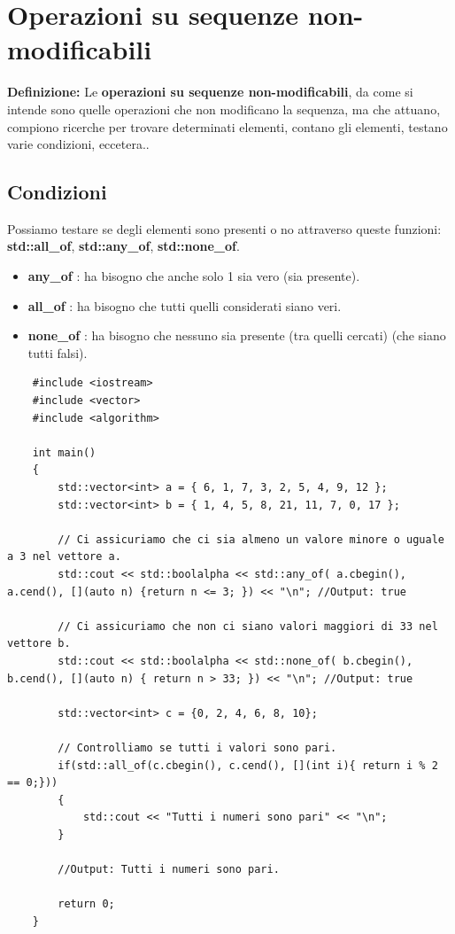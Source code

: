 
\newpage

\section{Operazioni su sequenze non-modificabili}

\textsf{\small \textbf{Definizione: } Le \textbf{operazioni su sequenze non-modificabili}, da come si intende sono quelle operazioni che non modificano la sequenza, ma che attuano, compiono ricerche per trovare determinati elementi, contano gli elementi, testano varie condizioni, eccetera..} \\

\subsection{Condizioni}

\textsf{\small Possiamo testare se degli elementi sono presenti o no attraverso queste funzioni: \textbf{std::all\_of}, \textbf{std::any\_of}, \textbf{std::none\_of}.} \\

\begin{itemize}
	\item \textsf{\small \textbf{any\_of} : ha bisogno che anche solo 1 sia vero (sia presente).}
	\item \textsf{\small \textbf{all\_of} : ha bisogno che tutti quelli considerati siano veri.}
	\item \textsf{\small \textbf{none\_of} : ha bisogno che nessuno sia presente (tra quelli cercati) (che siano tutti falsi).}
\end{itemize}

\begin{lstlisting}
	#include <iostream>
	#include <vector>
	#include <algorithm>
	
	int main()
	{
		std::vector<int> a = { 6, 1, 7, 3, 2, 5, 4, 9, 12 };
		std::vector<int> b = { 1, 4, 5, 8, 21, 11, 7, 0, 17 };
		
		// Ci assicuriamo che ci sia almeno un valore minore o uguale a 3 nel vettore a.
		std::cout << std::boolalpha << std::any_of( a.cbegin(), a.cend(), [](auto n) {return n <= 3; }) << "\n"; //Output: true
		
		// Ci assicuriamo che non ci siano valori maggiori di 33 nel vettore b.
		std::cout << std::boolalpha << std::none_of( b.cbegin(), b.cend(), [](auto n) { return n > 33; }) << "\n"; //Output: true
		
		std::vector<int> c = {0, 2, 4, 6, 8, 10};
		
		// Controlliamo se tutti i valori sono pari.
		if(std::all_of(c.cbegin(), c.cend(), [](int i){ return i % 2 == 0;}))
		{
			std::cout << "Tutti i numeri sono pari" << "\n";
		}
	
		//Output: Tutti i numeri sono pari.
		
		return 0;
	}	
\end{lstlisting}

